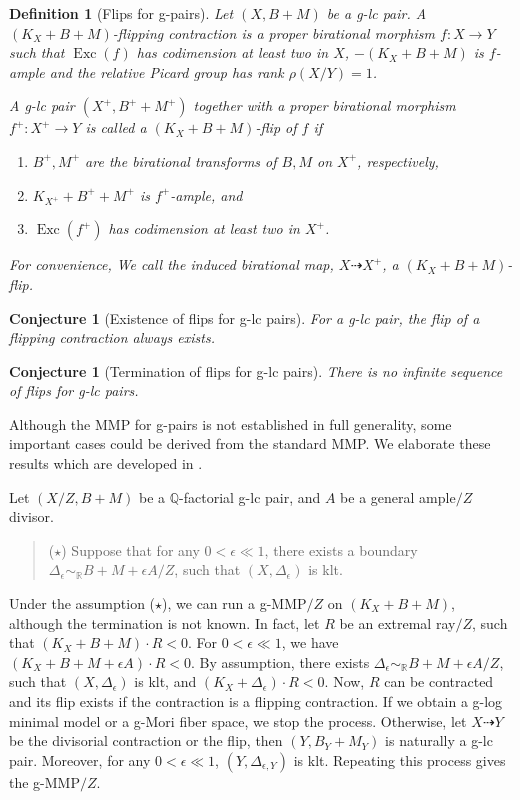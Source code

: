 \documentclass[11pt]{amsart}
\newcommand{\Rr}{\mathbb{R}}
\newcommand{\Qq}{\mathbb{Q}}
\newcommand{\Exc}{\operatorname{Exc}}
\newtheorem{definition}[theorem]{Definition}
\newtheorem{conjecture}[theorem]{Conjecture}
\begin{document}
\begin{definition}[Flips for g-pairs]
Let $(X,B+M)$ be a g-lc pair. A \emph{$(K_X+B+M)$-flipping contraction} is a proper birational morphism $f:X\to Y$ such that $\Exc(f)$ has codimension at least two in $X$, $-(K_X+B+M)$ is $f$-ample and the relative Picard group has rank $\rho(X/Y)=1$.
	
	A g-lc pair $(X^{+},B^{+}+M^{+})$ together with a proper birational morphism $f^{+}:X^{+}\to Y$ is called a \emph{$(K_X+B+M)$-flip} of $f$ if 
	\begin{enumerate}
		\item $B^{+}, M^{+}$ are the birational transforms of $B, M$ on $X^{+}$, respectively,
		\item $K_{X^{+}}+B^{+}+M^{+}$ is $f^{+}$-ample, and
		\item $\Exc(f^{+})$ has codimension at least two in $X^{+}$.
	\end{enumerate}
	For convenience, We call the induced birational map, $X\dashrightarrow X^{+}$, a $(K_X+B+M)$-flip.
\end{definition}
 
\begin{conjecture}[Existence of flips for g-lc pairs] For a g-lc pair, the flip of a flipping contraction always exists.
\end{conjecture}
\begin{conjecture}[Termination of flips for g-lc pairs] There is no infinite sequence of flips for g-lc pairs.
\end{conjecture}

Although the MMP for g-pairs is not established in full generality, some important cases could be derived from the standard MMP. We elaborate these results which are developed in \cite[\S 4]{BZ16}.

Let $(X/Z,B+M)$ be a $\Qq$-factorial g-lc pair, and $A$ be a general ample$/Z$ divisor. 

\begin{quote}
	($\star$) Suppose that for any $0<\epsilon\ll1$, there exists a boundary $\Delta_{\epsilon} \sim_\Rr B+M+\epsilon A/Z$, such that $(X,\Delta_{\epsilon})$ is klt. 
\end{quote}

Under the assumption ($\star$), we can run a g-MMP$/Z$ on $(K_X+B+M)$, although the termination is not known. In fact, let $R$ be an extremal ray$/Z$, such that $(K_X+B+M)\cdot R<0$. For $0<\epsilon\ll 1$, we have $(K_X+B+M+\epsilon A)\cdot R<0$. By assumption, there exists $\Delta_{\epsilon} \sim_\Rr B+M+\epsilon A/Z$, such that $(X,\Delta_{\epsilon})$ is klt, and $(K_X+\Delta_{\epsilon})\cdot R<0$. Now, $R$ can be contracted and its flip exists if the contraction is a flipping contraction. If we obtain a g-log minimal model or a g-Mori fiber space, we stop the process. Otherwise, let $X\dashrightarrow Y$ be the divisorial contraction or the flip, then $(Y,B_{Y}+M_{Y})$ is naturally a g-lc pair. Moreover, for any $0<\epsilon\ll 1$, $(Y,\Delta_{\epsilon,Y})$ is klt. Repeating this process gives the g-MMP$/Z$.
\end{document}
